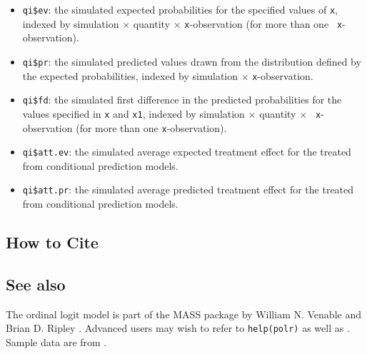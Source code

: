\begin{itemize}
   \begin{itemize}
   \item {\tt qi\$ev}: the simulated expected probabilities for the
     specified values of {\tt x}, indexed by simulation $\times$
     quantity $\times$ {\tt x}-observation (for more than one {\tt
       x}-observation).
   \item {\tt qi\$pr}: the simulated predicted values drawn from the
     distribution defined by the expected probabilities, indexed by
     simulation $\times$ {\tt x}-observation.
   \item {\tt qi\$fd}: the simulated first difference in the predicted
     probabilities for the values specified in {\tt x} and {\tt x1},
     indexed by simulation $\times$ quantity $\times$ {\tt
       x}-observation (for more than one {\tt x}-observation).
   \item {\tt qi\$att.ev}: the simulated average expected treatment
     effect for the treated from conditional prediction models.  
   \item {\tt qi\$att.pr}: the simulated average predicted treatment
     effect for the treated from conditional prediction models.  
   \end{itemize}
\end{itemize}

\subsection* {How to Cite} 




\subsection* {See also}
The ordinal logit model is part of the MASS package by William N. Venable and Brian D. Ripley \citep{VenRip02}. Advanced users may wish to refer to \texttt{help(polr)} as well as \cite{McCNel89}. Sample data are from \cite{Martin92}.
